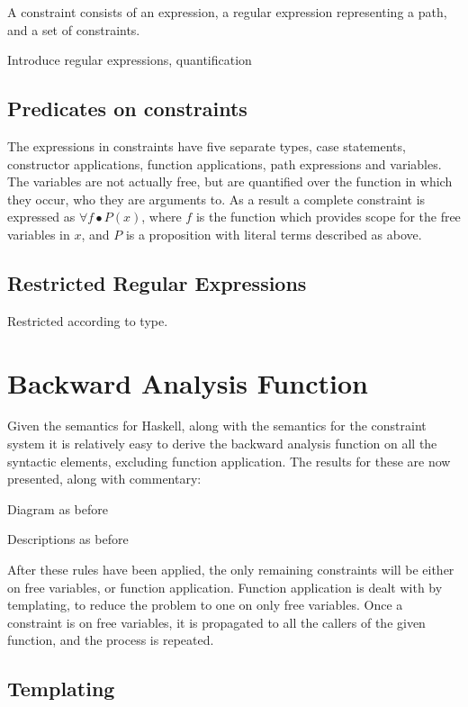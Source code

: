 \documentclass[preprint]{sigplanconf}
\begin{document}
A constraint consists of an expression, a regular expression representing a
path, and a set of constraints.

Introduce regular expressions, quantification


\subsection{Predicates on constraints}

The expressions in constraints have five separate types, case statements,
constructor applications, function applications, path expressions and
variables. The variables are not actually free, but are quantified over the
function in which they occur, who they are arguments to. As a result a complete
constraint is expressed as $\forall f \bullet P(x)$, where $f$ is the function
which provides scope for the free variables in $x$, and $P$ is a proposition
with literal terms described as above.

\subsection{Restricted Regular Expressions}

Restricted according to type.

\section{Backward Analysis Function}
\label{chap:backward}

Given the semantics for Haskell, along with the semantics for the constraint
system it is relatively easy to derive the backward analysis function on all
the syntactic elements, excluding function application. The results for these
are now presented, along with commentary:

Diagram as before

Descriptions as before

After these rules have been applied, the only remaining constraints will be
either on free variables, or function application. Function application is
dealt with by templating, to reduce the problem to one on only free variables.
Once a constraint is on free variables, it is propagated to all the callers of
the given function, and the process is repeated.

\subsection{Templating}
\end{document}
